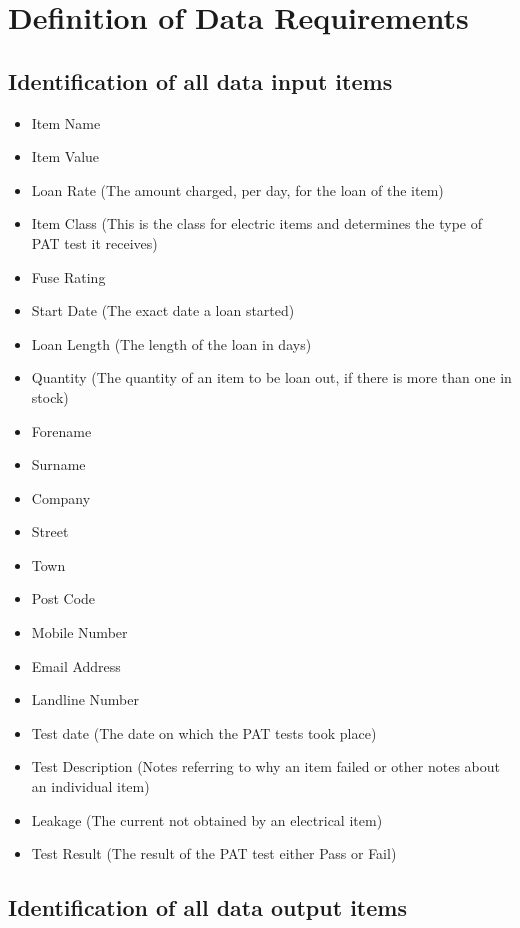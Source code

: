 \section{Definition of Data Requirements}

\subsection{Identification of all data input items}

\begin{itemize}
    \item Item Name
    \item Item Value
    \item Loan Rate (The amount charged, per day, for the loan of the item)
    \item Item Class (This is the class for electric items and determines the type of PAT test it receives)
    \item Fuse Rating\\ \hline
    \item Start Date (The exact date a loan started)
    \item Loan Length (The length of the loan in days)
    \item Quantity (The quantity of an item to be loan out, if there is more than one in stock)\\ \hline
    \item Forename
    \item Surname
    \item Company
    \item Street
    \item Town
    \item Post Code
    \item Mobile Number
    \item Email Address
    \item Landline Number\\ \hline
    \item Test date (The date on which the PAT tests took place)
    \item Test Description (Notes referring to why an item failed or other notes about an individual item)
    \item Leakage (The current not obtained by an electrical item)
    \item Test Result (The result of the PAT test either Pass or Fail)
\end{itemize}

\subsection{Identification of all data output items}

